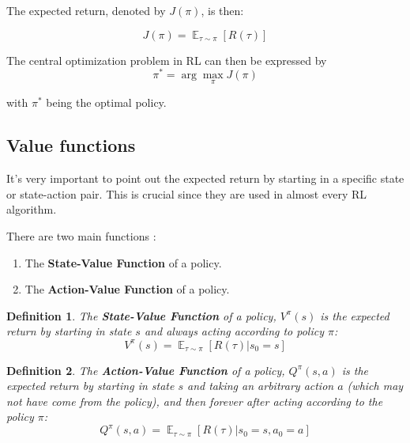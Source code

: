 \documentclass{article}
\newtheorem{definition}{Definition}
\DeclareMathOperator*{\E}{\mathbb{E}}
\begin{document}
The expected return, denoted by $J(\pi)$, is then:

\begin{equation}
J(\pi) = \E_{\tau\sim \pi}{[R(\tau)]}
\label{eq:loss}
\end{equation}

The central optimization problem in RL can then be expressed by
\begin{equation}
\pi^* = \arg \max_{\pi} J(\pi)
\label{eq:max_loss}
\end{equation}

with $\pi^*$ being the optimal policy.


\subsection{Value functions}
It's very important to point out the expected return by starting in a specific state or state-action pair. This is crucial since they are used in almost every RL algorithm.

There are two main functions \cite{silver2015}:


\begin{enumerate}
	\item The \textbf{State-Value Function} of a policy.
	
	\item The \textbf{Action-Value Function} of a policy.
	
\end{enumerate}

	
\begin{definition}
	The \textbf{State-Value Function} of a policy, $V^{\pi}(s)$ is the expected return by starting in state $s$ and always acting according to policy $\pi$:
	\begin{equation}
		V^{\pi}(s) = \E_{\tau \sim \pi} [R(\tau)| s_0 = s]
	\end{equation}
\end{definition}

\begin{definition}
	The \textbf{Action-Value Function} of a policy, $Q^{\pi}(s,a)$ is the expected return by starting in state $s$ and taking an arbitrary action $a$ (which may not have come from the policy), and then forever after acting according to the policy $\pi$:
	\begin{equation}
			Q^{\pi}(s,a) = \E_{\tau \sim \pi}[R(\tau)| s_0 = s, a_0 = a]	
	\end{equation}
	
\end{definition}
\end{document}
